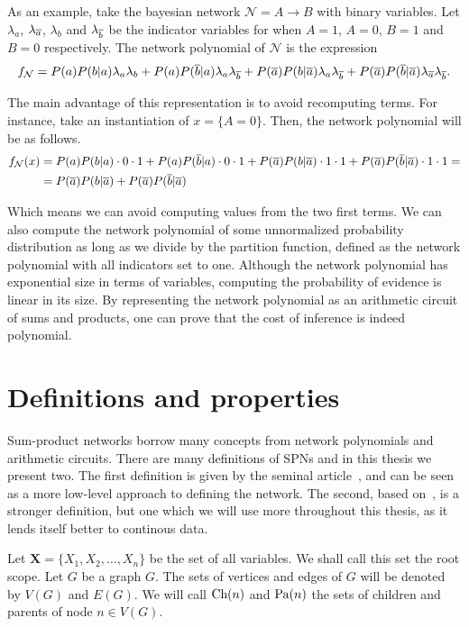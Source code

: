 As an example, take the bayesian network $\mathcal{N}=A\to B$ with binary variables. Let
$\lambda_a$, $\lambda_{\overline{a}}$, $\lambda_b$ and $\lambda_{\overline{b}}$ be the indicator variables for
when $A=1$, $A=0$, $B=1$ and $B=0$ respectively. The network polynomial of $\mathcal{N}$ is the
expression
\begin{equation*}
  f_{\mathcal{N}}=P(a)P(b|a)\lambda_a\lambda_b+P(a)P(\overline{b}|a)\lambda_a\lambda_{\overline{b}}+
  P(\overline{a})P(b|\overline{a})\lambda_a\lambda_{\overline{b}}+P(\overline{a})P(\overline{b}|\overline{a})\lambda_{\overline{a}}
  \lambda_{\overline{b}}.
\end{equation*}

The main advantage of this representation is to avoid recomputing terms. For instance, take an
instantiation of $x=\{A=0\}$. Then, the network polynomial will be as follows.
\begin{align*}
  f_{\mathcal{N}}(x)&=P(a)P(b|a)\cdot 0\cdot 1+P(a)P(\overline{b}|a)\cdot 0\cdot
  1+P(\overline{a})P(b|\overline{a})\cdot 1\cdot 1+P(\overline{a})P(\overline{b}|\overline{a})\cdot 1\cdot 1=\\
  &=P(\overline{a})P(b|\overline{a})+P(\overline{a})P(\overline{b}|\overline{a})
\end{align*}

Which means we can avoid computing values from the two first terms. We can also compute the network
polynomial of some unnormalized probability distribution as long as we divide by the partition
function, defined as the network polynomial with all indicators set to one. Although the network
polynomial has exponential size in terms of variables, computing the probability of evidence is
linear in its size. By representing the network polynomial as an arithmetic circuit of sums and
products, one can prove that the cost of inference is indeed polynomial.

\section{Definitions and properties}

Sum-product networks borrow many concepts from network polynomials and arithmetic circuits. There
are many definitions of SPNs and in this thesis we present two. The first definition is given by
the seminal article~\cite{poon-domingos}, and can be seen as a more low-level approach to defining
the network\@. The second, based on~\cite{gens-domingos}, is a stronger definition, but one which
we will use more throughout this thesis, as it lends itself better to continous data.

Let $\mathbf{X}=\{X_1,X_2,\ldots,X_n\}$ be the set of all variables. We shall call this set the
root scope. Let $G$ be a graph $G$. The sets of vertices and edges of $G$ will be denoted by $V(G)$
and $E(G)$. We will call $\operatorname*{\text{Ch}}(n)$ and $\operatorname*{\text{Pa}}(n)$ the sets of children and parents of node $n\in
V(G)$.

